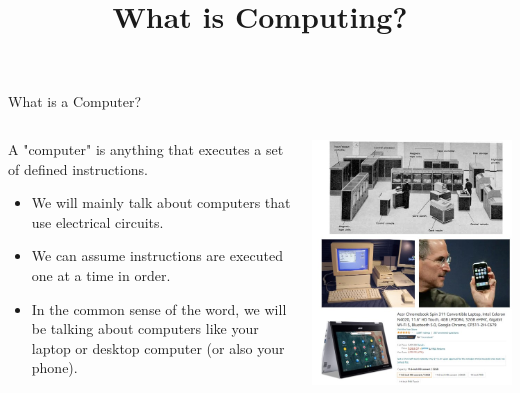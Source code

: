 \documentclass[]{beamer}
\title{What is Computing?}
\date{}
\begin{document}
\begin{frame}
    \titlepage
\end{frame}

\begin{frame}{What is a Computer?}

    \begin{columns}
        \begin{column}{0.5\textwidth}
            A "computer" is anything that executes a set of defined instructions.

            \vspace{\baselineskip}

            \begin{itemize}
                \item We will mainly talk about computers that use electrical circuits.
                \item We can assume instructions are executed one at a time in order.
                \item In the common sense of the word, we will be talking about computers like your laptop or desktop computer (or also your phone).
            \end{itemize}
        \end{column}
        \begin{column}{0.5\textwidth}
            \includegraphics[width=\textwidth]{imgs/vis_0.jpg}
        \end{column}
    \end{columns}
\end{frame}
\end{document}
